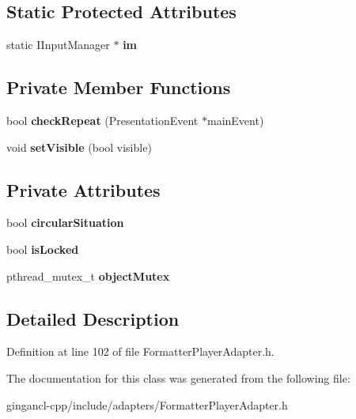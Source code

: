 \subsection*{Static Protected Attributes}
\begin{CompactItemize}
\item 
static IInputManager $\ast$ {\bf im}\label{classbr_1_1pucrio_1_1telemidia_1_1ginga_1_1ncl_1_1adapters_1_1FormatterPlayerAdapter_1a7a3c6296297c71a86bc018607fdcfe}

\end{CompactItemize}
\subsection*{Private Member Functions}
\begin{CompactItemize}
\item 
bool \textbf{checkRepeat} (PresentationEvent $\ast$mainEvent)\label{classbr_1_1pucrio_1_1telemidia_1_1ginga_1_1ncl_1_1adapters_1_1FormatterPlayerAdapter_7ca4e93e6084a794e5b6a36269146008}

\item 
void \textbf{setVisible} (bool visible)\label{classbr_1_1pucrio_1_1telemidia_1_1ginga_1_1ncl_1_1adapters_1_1FormatterPlayerAdapter_18e44e30b31525a243960ca3928125aa}

\end{CompactItemize}
\subsection*{Private Attributes}
\begin{CompactItemize}
\item 
bool {\bf circularSituation}\label{classbr_1_1pucrio_1_1telemidia_1_1ginga_1_1ncl_1_1adapters_1_1FormatterPlayerAdapter_07be4b24552884b62d3bb105f1d6e5b0}

\item 
bool {\bf isLocked}\label{classbr_1_1pucrio_1_1telemidia_1_1ginga_1_1ncl_1_1adapters_1_1FormatterPlayerAdapter_0774f698e7c923fe33adcfe95cdf9e73}

\item 
pthread\_\-mutex\_\-t {\bf objectMutex}\label{classbr_1_1pucrio_1_1telemidia_1_1ginga_1_1ncl_1_1adapters_1_1FormatterPlayerAdapter_9c0904857abfd26acb747a915521e949}

\end{CompactItemize}


\subsection{Detailed Description}




Definition at line 102 of file FormatterPlayerAdapter.h.

The documentation for this class was generated from the following file:\begin{CompactItemize}
\item 
gingancl-cpp/include/adapters/FormatterPlayerAdapter.h\end{CompactItemize}
